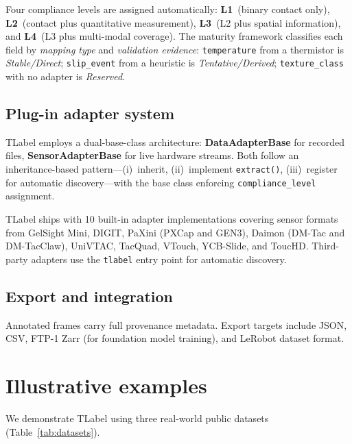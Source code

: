 \documentclass[preprint,12pt,a4paper]{elsarticle}
\begin{document}
Four compliance levels are assigned automatically: \textbf{L1}~(binary contact only), \textbf{L2}~(contact plus quantitative measurement), \textbf{L3}~(L2 plus spatial information), and \textbf{L4}~(L3 plus multi-modal coverage). The maturity framework classifies each field by \textit{mapping type} and \textit{validation evidence}: \texttt{temperature} from a thermistor is \textit{Stable/Direct}; \texttt{slip\_event} from a heuristic is \textit{Tentative/Derived}; \texttt{texture\_class} with no adapter is \textit{Reserved}.

\subsection{Plug-in adapter system}

TLabel employs a dual-base-class architecture: \textbf{DataAdapterBase} for recorded files, \textbf{SensorAdapterBase} for live hardware streams. Both follow an inheritance-based pattern---(i)~inherit, (ii)~implement \texttt{extract()}, (iii)~register for automatic discovery---with the base class enforcing \texttt{compliance\_level} assignment.

TLabel ships with 10 built-in adapter implementations covering sensor formats from GelSight Mini, DIGIT, PaXini (PXCap and GEN3), Daimon (DM-Tac and DM-TacClaw), UniVTAC, TacQuad, VTouch, YCB-Slide, and ToucHD. Third-party adapters use the \texttt{tlabel} entry point for automatic discovery.

\subsection{Export and integration}

Annotated frames carry full provenance metadata. Export targets include JSON, CSV, FTP-1 Zarr (for foundation model training), and LeRobot dataset format.

\section{Illustrative examples}
\label{sec:examples}

We demonstrate TLabel using three real-world public datasets (Table~\ref{tab:datasets}).
\end{document}
